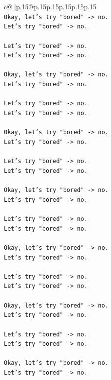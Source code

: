 \documentclass{article}
\begin{document}
{\begin{supertabular}{c@{$\;$}|p{.15\linewidth}@{}p{.15\linewidth}p{.15\linewidth}p{.15\linewidth}p{.15\linewidth}p{.15\linewidth}}
{{{\\ 
\texttt{Okay, let's try "bored" {-}> no.} \\
\texttt{Let's try "bored" {-}> no.} \\
\\ 
\texttt{Let's try "bored" {-}> no.} \\
\texttt{Let's try "bored" {-}> no.} \\
\\ 
\texttt{Okay, let's try "bored" {-}> no.} \\
\texttt{Let's try "bored" {-}> no.} \\
\\ 
\texttt{Let's try "bored" {-}> no.} \\
\texttt{Let's try "bored" {-}> no.} \\
\\ 
\texttt{Okay, let's try "bored" {-}> no.} \\
\texttt{Let's try "bored" {-}> no.} \\
\\ 
\texttt{Let's try "bored" {-}> no.} \\
\texttt{Let's try "bored" {-}> no.} \\
\\ 
\texttt{Okay, let's try "bored" {-}> no.} \\
\texttt{Let's try "bored" {-}> no.} \\
\\ 
\texttt{Let's try "bored" {-}> no.} \\
\texttt{Let's try "bored" {-}> no.} \\
\\ 
\texttt{Okay, let's try "bored" {-}> no.} \\
\texttt{Let's try "bored" {-}> no.} \\
\\ 
\texttt{Let's try "bored" {-}> no.} \\
\texttt{Let's try "bored" {-}> no.} \\
\\ 
\texttt{Okay, let's try "bored" {-}> no.} \\
\texttt{Let's try "bored" {-}> no.} \\
\\ 
\texttt{Let's try "bored" {-}> no.} \\
\texttt{Let's try "bored" {-}> no.} \\
\\ 
\texttt{Okay, let's try "bored" {-}> no.} \\
\texttt{Let's try "bored" {-}> no.} \\
}}}
\end{supertabular}}
\end{document}
